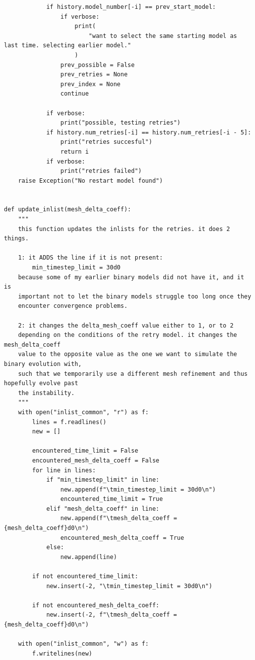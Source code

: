 \documentclass[a4paper,10pt]{article}
\begin{document}
\begin{full}
\begin{verbatim}
            if history.model_number[-i] == prev_start_model:
                if verbose:
                    print(
                        "want to select the same starting model as last time. selecting earlier model."
                    )
                prev_possible = False
                prev_retries = None
                prev_index = None
                continue

            if verbose:
                print("possible, testing retries")
            if history.num_retries[-i] == history.num_retries[-i - 5]:
                print("retries succesful")
                return i
            if verbose:
                print("retries failed")
    raise Exception("No restart model found")


def update_inlist(mesh_delta_coeff):
    """
    this function updates the inlists for the retries. it does 2 things.

    1: it ADDS the line if it is not present:
        min_timestep_limit = 30d0
    because some of my earlier binary models did not have it, and it is
    important not to let the binary models struggle too long once they
    encounter convergence problems.

    2: it changes the delta_mesh_coeff value either to 1, or to 2
    depending on the conditions of the retry model. it changes the mesh_delta_coeff
    value to the opposite value as the one we want to simulate the binary evolution with,
    such that we temporarily use a different mesh refinement and thus hopefully evolve past
    the instability.
    """
    with open("inlist_common", "r") as f:
        lines = f.readlines()
        new = []

        encountered_time_limit = False
        encountered_mesh_delta_coeff = False
        for line in lines:
            if "min_timestep_limit" in line:
                new.append(f"\tmin_timestep_limit = 30d0\n")
                encountered_time_limit = True
            elif "mesh_delta_coeff" in line:
                new.append(f"\tmesh_delta_coeff = {mesh_delta_coeff}d0\n")
                encountered_mesh_delta_coeff = True
            else:
                new.append(line)

        if not encountered_time_limit:
            new.insert(-2, "\tmin_timestep_limit = 30d0\n")

        if not encountered_mesh_delta_coeff:
            new.insert(-2, f"\tmesh_delta_coeff = {mesh_delta_coeff}d0\n")

    with open("inlist_common", "w") as f:
        f.writelines(new)



\end{verbatim}
\end{full}
\end{document}
